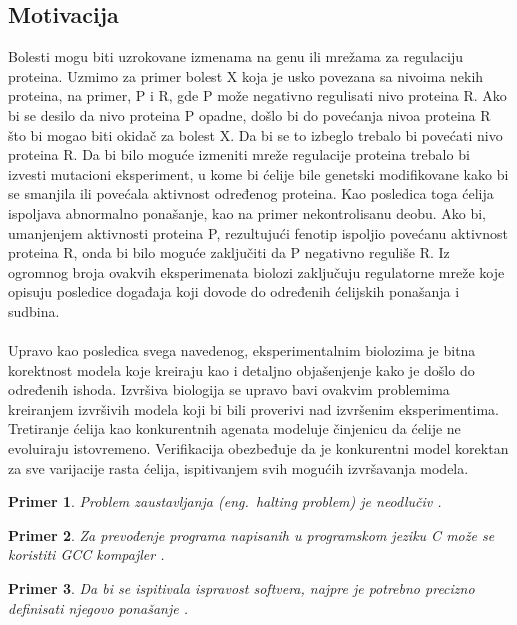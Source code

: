 \documentclass[a4paper]{article}
\newtheorem{primer}{Primer}[section]
\begin{document}
\subsection{Motivacija}
Bolesti mogu biti uzrokovane izmenama na genu ili mrežama za regulaciju proteina. Uzmimo za primer bolest X koja je usko povezana sa nivoima nekih proteina, na primer, P i R, gde P može negativno regulisati nivo proteina R. Ako bi se desilo da nivo proteina P opadne, došlo bi do povećanja nivoa proteina R što bi mogao biti okidač za bolest X. Da bi se to izbeglo trebalo bi povećati nivo proteina R. Da bi bilo moguće izmeniti mreže regulacije proteina trebalo bi izvesti mutacioni eksperiment, u kome bi ćelije bile genetski modifikovane kako bi se smanjila ili povećala aktivnost određenog proteina. Kao posledica toga ćelija ispoljava abnormalno ponašanje, kao na primer nekontrolisanu deobu. Ako bi, umanjenjem aktivnosti proteina P, rezultujući fenotip ispoljio povećanu aktivnost proteina R, onda bi bilo moguće zaključiti da P negativno reguliše R. Iz ogromnog broja ovakvih eksperimenata biolozi zaključuju regulatorne mreže koje opisuju posledice događaja koji dovode do određenih ćelijskih ponašanja i sudbina.\\\\
Upravo kao posledica svega navedenog, eksperimentalnim biolozima je bitna korektnost modela koje kreiraju kao i detaljno objašenjenje kako je došlo do određenih ishoda. Izvršiva biologija se upravo bavi ovakvim problemima kreiranjem izvršivih modela koji bi bili proverivi nad izvršenim eksperimentima. Tretiranje ćelija kao konkurentnih agenata modeluje činjenicu da ćelije ne evoluiraju istovremeno. Verifikacija obezbeđuje da je konkurentni model korektan za sve varijacije rasta ćelija, ispitivanjem svih mogućih izvršavanja modela.

\begin{primer}
Problem zaustavljanja (eng.~{\em halting problem}) je neodlučiv \cite{haltingproblem}.
\end{primer}

\begin{primer}
Za prevođenje programa napisanih u programskom jeziku C može se koristiti GCC kompajler \cite{gcc}.
\end{primer}

\begin{primer}
 Da bi se ispitivala ispravost softvera, najpre je potrebno precizno definisati njegovo ponašanje \cite{laski2009software}. 
\end{primer}
\end{document}
